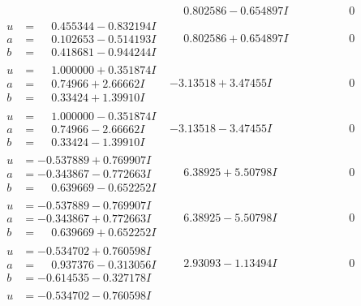 \documentclass[1p]{elsarticle_modified}
\theoremstyle{definition}
\begin{document}
$$\begin{array}{c|c|c}
 & \phantom{-}0.802586 - 0.654897 I & \phantom{-0.000000 } 0 \\ \hline\begin{aligned}
u &= \phantom{-}0.455344 - 0.832194 I \\
a &= \phantom{-}0.102653 - 0.514193 I \\
b &= \phantom{-}0.418681 - 0.944244 I\end{aligned}
 & \phantom{-}0.802586 + 0.654897 I & \phantom{-0.000000 } 0 \\ \hline\begin{aligned}
u &= \phantom{-}1.000000 + 0.351874 I \\
a &= \phantom{-}0.74966 + 2.66662 I \\
b &= \phantom{-}0.33424 + 1.39910 I\end{aligned}
 & -3.13518 + 3.47455 I & \phantom{-0.000000 } 0 \\ \hline\begin{aligned}
u &= \phantom{-}1.000000 - 0.351874 I \\
a &= \phantom{-}0.74966 - 2.66662 I \\
b &= \phantom{-}0.33424 - 1.39910 I\end{aligned}
 & -3.13518 - 3.47455 I & \phantom{-0.000000 } 0 \\ \hline\begin{aligned}
u &= -0.537889 + 0.769907 I \\
a &= -0.343867 - 0.772663 I \\
b &= \phantom{-}0.639669 - 0.652252 I\end{aligned}
 & \phantom{-}6.38925 + 5.50798 I & \phantom{-0.000000 } 0 \\ \hline\begin{aligned}
u &= -0.537889 - 0.769907 I \\
a &= -0.343867 + 0.772663 I \\
b &= \phantom{-}0.639669 + 0.652252 I\end{aligned}
 & \phantom{-}6.38925 - 5.50798 I & \phantom{-0.000000 } 0 \\ \hline\begin{aligned}
u &= -0.534702 + 0.760598 I \\
a &= \phantom{-}0.937376 - 0.313056 I \\
b &= -0.614535 - 0.327178 I\end{aligned}
 & \phantom{-}2.93093 - 1.13494 I & \phantom{-0.000000 } 0 \\ \hline\begin{aligned}
u &= -0.534702 - 0.760598 I \\

\end{aligned}
\end{array}$$
\end{document}
